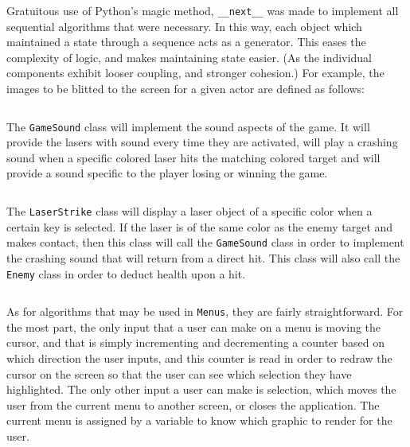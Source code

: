 Gratuitous use of Python's magic method, \texttt{__next__}
was made to implement all sequential algorithms that were necessary.
In this way, each object which maintained a state through a sequence
acts as a generator.  This eases the complexity of logic, and makes
maintaining state easier. (As the individual components exhibit looser
coupling, and stronger cohesion.)  For example, the images to be blitted
to the screen for a given actor are defined as follows:

\inputminted[baselinestretch=1]{python}{../code/RenderedBase.py}

The \texttt{GameSound} class will implement the sound
aspects of the game.  It will provide the lasers with sound every
time they are activated, will play a crashing sound when a specific
colored laser hits the matching colored target and will provide a
sound specific to the player losing or winning the game.

\inputminted[baselinestretch=1]{python}{../code/GameSound.py}

The \texttt{LaserStrike} class will display a laser
object of a specific color when a certain key is selected. If the
laser is of the same color as the enemy target and makes contact,
then this class will call the \texttt{GameSound} class
in order to implement the crashing sound that will return from a
direct hit. This class will also call the \texttt{Enemy}
class in order to deduct health upon a hit.

\inputminted[baselinestretch=1]{python}{../code/LaserStrike.py}

As for algorithms that may be used in \texttt{Menus}, they
are fairly straightforward. For the most part, the only input that a
user can make on a menu is moving the cursor, and that is simply
incrementing and decrementing a counter based on which direction the
user inputs, and this counter is read in order to redraw the cursor on
the screen so that the user can see which selection they have highlighted.
The only other input a user can make is selection, which moves the user
from the current menu to another screen, or closes the application. The
current menu is assigned by a variable to know which graphic to render for
the user.
